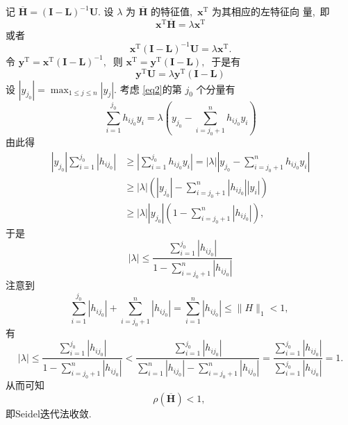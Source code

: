 	\begin{solution}
		记  $\overline{\boldsymbol{H}}=(\boldsymbol{I}-\boldsymbol{L})^{-1} \boldsymbol{U} .$ 设  $\lambda$  为  $\overline{\boldsymbol{H}}$  的特征值,\   $\boldsymbol{x}^{\mathrm{T}}$  为其相应的左特征向 量,\  即
		$$\boldsymbol{x}^{\mathrm{T}} \overline{\boldsymbol{H}}=\lambda \boldsymbol{x}^{\mathrm{T}}$$
		或者
		$$\boldsymbol{x}^{\mathrm{T}}(\boldsymbol{I}-\boldsymbol{L})^{-1} \boldsymbol{U}=\lambda \boldsymbol{x}^{\mathrm{T}} .$$
		令  $\boldsymbol{y}^{\mathrm{T}}=\boldsymbol{x}^{\mathrm{T}}(\boldsymbol{I}-\boldsymbol{L})^{-1} ,\ $ 则  $\boldsymbol{x}^{\mathrm{T}}=\boldsymbol{y}^{\mathrm{T}}(\boldsymbol{I}-\boldsymbol{L}) ,\ $ 于是有
		\begin{equation}
			\boldsymbol{y}^{\mathrm{T}} \boldsymbol{U}=\lambda \boldsymbol{y}^{\mathrm{T}}(\boldsymbol{I}-\boldsymbol{L})\label{eq2}
		\end{equation}
		设  $\left|y_{j_{0}}\right|=\max _{1 \leqslant j \leqslant n}\left|y_{j}\right| .$ 考虑 \eqref{eq2}的第  $j_{0}$  个分量有
		$$\sum_{i=1}^{j_{0}} h_{i j_{0}} y_{i}=\lambda\left(y_{j_{0}}-\sum_{i=j_{0}+1}^{n} h_{i j_{0}} y_{i}\right)$$
		由此得
		$$\begin{aligned}
			\left|y_{j_{0}}\right| \sum_{i=1}^{j_{0}}\left|h_{i j_{0}}\right| & \geqslant\left|\sum_{i=1}^{j_{0}} h_{i j_{0}} y_{i}\right|=|\lambda|\left|y_{j_{0}}-\sum_{i=j_{0}+1}^{n} h_{i j_{0}} y_{i}\right| \\
			& \geqslant|\lambda|\left(\left|y_{j_{0}}\right|-\sum_{i=j_{0}+1}^{n}\left|h_{i j_{0}}\right|\left|y_{i}\right|\right) \\
			& \geqslant|\lambda|\left|y_{j_{0}}\right|\left(1-\sum_{i=j_{0}+1}^{n}\left|h_{i j_{0}}\right|\right),\ 
		\end{aligned}$$
		于是
		$$|\lambda| \leqslant \frac{\sum_{i=1}^{j_{0}}\left|h_{i j_{0}}\right|}{1-\sum_{i=j_{0}+1}^{n}\left|h_{i j_{0}}\right|}$$
		注意到
		$$\sum_{i=1}^{j_{0}}\left|h_{i j_{0}}\right|+\sum_{i=j_{0}+1}^{n}\left|h_{i j_{0}}\right|=\sum_{i=1}^{n}\left|h_{i j_{0}}\right| \leqslant\|H\|_{1}<1,\ $$
		有
		$$|\lambda| \leqslant \frac{\sum_{i=1}^{j_{0}}\left|h_{i j_{0}}\right|}{1-\sum_{i=j_{0}+1}^{n}\left|h_{i j_{0}}\right|}<\frac{\sum_{i=1}^{j_{0}}\left|h_{i j_{0}}\right|}{\sum_{i=1}^{n}\left|h_{i j_{0}}\right|-\sum_{i=j_{0}+1}^{n}\left|h_{i j_{0}}\right|}=\frac{\sum_{i=1}^{j_{0}}\left|h_{i j_{0}}\right|}{\sum_{i=1}^{j_{0}}\left|h_{i j_{0}}\right|}=1 .$$
		从而可知
		$$\rho(\overline{\boldsymbol{H}})<1,\ $$
		即$\mathrm{Seidel}$迭代法收敛. 
	\end{solution}
